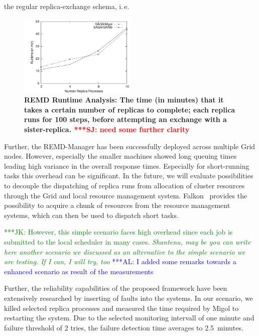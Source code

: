 \documentclass[times, 10pt, twocolumn]{article}
\newcommand{\kimnote}[1]{ {\textcolor{green} { ***JK: #1 }}}
\newcommand{\alnote}[1]{ {\textcolor{blue} { ***AL: #1 }}}
\newcommand{\jhanote}[1]{ {\textcolor{red} { ***SJ: #1 }}}
\newcommand{\kimnote}[1]{}
\newcommand{\alnote}[1]{}
\newcommand{\jhanote}[1]{}
\begin{document}
the regular replica-exchange schema, i.\,e.\ 
\begin{figure}[htbp]
    \centering
        \includegraphics[width=0.5\textwidth]{performance/perf_remd.pdf}
        \caption{\small \bf REMD Runtime Analysis: The time (in minutes) that it
          takes a certain number of replicas to complete; each replica
          runs for 100 steps, before attempting an exchange with a
          sister-replica. \jhanote{need some further clarity}}
    \label{fig:performance_perf_runtime}
\end{figure}     

Further, the REMD-Manager has been successfully deployed across
multiple Grid nodes.  However, especially the smaller machines showed
long queuing times leading high variance in the overall response
times. Especially for short-running tasks this overhead can be
significant. In the future, we will evaluate possibilities to decouple
the dispatching of replica runs from allocation of cluster resources
through the Grid and local resource management
system. Falkon~\cite{1362680} provides the possibility to acquire a
chunk of resources from the resource management systems, which can
then be used to dispatch short tasks.

\kimnote{However, this simple scenario faces high overhead since each
  job is submitted to the local scheduler in many cases. \it
  Shantenu, may be you can write here another scenario we discussed
  as an alternative to the simple scenario we are testing.  If I can,
  I will try, too }            
\alnote{I added some remarks towards a enhanced scenario as result of the measurements}  

Further, the reliability capabilities of the proposed framework have
been extensively researched by inserting of faults into the
systems. In our scenario, we killed selected replica processes and
measured the time required by Migol to restarting the system.  Due to
the selected monitoring intervall of one minute and failure threshold
of 2 tries, the failure detection time averages to 2.5\, minutes.
\end{document}
